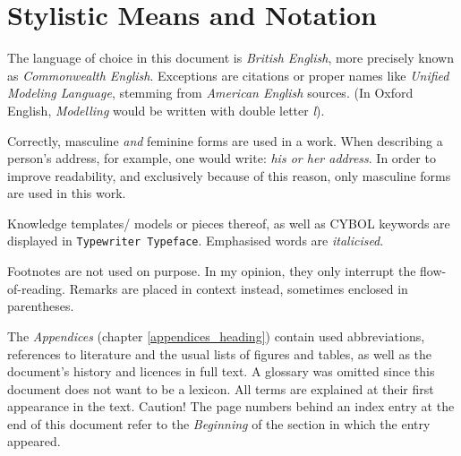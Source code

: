 %
%
%
%
%
%

\section*{Stylistic Means and Notation}
\label{stylistic_means_heading}

The language of choice in this document is \emph{British English}, more
precisely known as \emph{Commonwealth English}. Exceptions are citations or
proper names like \emph{Unified Modeling Language}, stemming from
\emph{American English} sources. (In Oxford English, \emph{Modelling} would be
written with double letter \emph{l}).

Correctly, masculine \emph{and} feminine forms are used in a work. When
describing a person's address, for example, one would write: \textit{his or her
address}. In order to improve readability, and exclusively because of this
reason, only masculine forms are used in this work.

Knowledge templates/ models or pieces thereof, as well as CYBOL keywords are
displayed in \texttt{Typewriter Typeface}. Emphasised words are \emph{italicised}.

Footnotes are not used on purpose. In my opinion, they only interrupt the
flow-of-reading. Remarks are placed in context instead, sometimes enclosed in
parentheses.

The \emph{Appendices} (chapter \ref{appendices_heading}) contain used
abbreviations, references to literature and the usual lists of figures and
tables, as well as the document's history and licences in full text. A glossary
was omitted since this document does not want to be a lexicon. All terms are
explained at their first appearance in the text. Caution! The page numbers
behind an index entry at the end of this document refer to the \emph{Beginning}
of the section in which the entry appeared.
